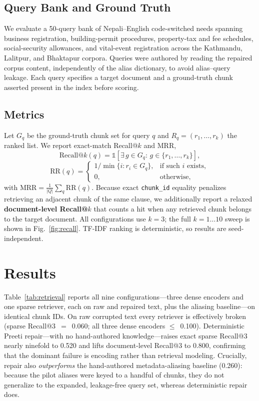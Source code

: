 \documentclass[journal]{IEEEtran}
\newcommand{\nqueries}{50}
\newcommand{\rawRecall}{0.060}
\newcommand{\repRecall}{0.520}
\newcommand{\repDocRecall}{0.800}
\newcommand{\aliRecall}{0.260}
\newcommand{\denseBgeRawRecall}{0.100}
\begin{document}
\subsection{Query Bank and Ground Truth}
We evaluate a \nqueries{}-query bank of Nepali--English code-switched needs spanning business registration, building-permit procedures, property-tax and fee schedules, social-security allowances, and vital-event registration across the Kathmandu, Lalitpur, and Bhaktapur corpora. Queries were authored by reading the repaired corpus content, independently of the alias dictionary, to avoid alias--query leakage. Each query specifies a target document and a ground-truth chunk asserted present in the index before scoring.

\subsection{Metrics}
Let $G_q$ be the ground-truth chunk set for query $q$ and $R_q=(r_1,\ldots,r_k)$ the ranked list. We report exact-match Recall@$k$ and MRR,
\begin{equation}
\mathrm{Recall@}k(q)=\mathbb{1}\!\left[\exists\, g\in G_q:\, g\in\{r_1,\ldots,r_k\}\right],
\end{equation}
\begin{equation}
\mathrm{RR}(q)=\begin{cases}1/\min\{i:r_i\in G_q\}, & \text{if such }i\text{ exists},\\ 0, & \text{otherwise},\end{cases}
\end{equation}
with $\mathrm{MRR}=\frac{1}{|Q|}\sum_q \mathrm{RR}(q)$. Because exact \texttt{chunk\_id} equality penalizes retrieving an adjacent chunk of the same clause, we additionally report a relaxed \textbf{document-level Recall@$k$} that counts a hit when any retrieved chunk belongs to the target document. All configurations use $k{=}3$; the full $k{=}1\ldots10$ sweep is shown in Fig.~\ref{fig:recall}. TF-IDF ranking is deterministic, so results are seed-independent.

\section{Results}
Table~\ref{tab:retrieval} reports all nine configurations---three dense encoders and one sparse retriever, each on raw and repaired text, plus the aliasing baseline---on identical chunk IDs. On raw corrupted text every retriever is effectively broken (sparse Recall@3~$=$~\rawRecall{}; all three dense encoders $\le$~\denseBgeRawRecall{}). Deterministic Preeti repair---with no hand-authored knowledge---raises exact sparse Recall@3 nearly ninefold to \repRecall{} and lifts document-level Recall@3 to \repDocRecall{}, confirming that the dominant failure is encoding rather than retrieval modeling. Crucially, repair also \emph{outperforms} the hand-authored metadata-aliasing baseline (\aliRecall{}): because the pilot aliases were keyed to a handful of chunks, they do not generalize to the expanded, leakage-free query set, whereas deterministic repair does.
\end{document}
